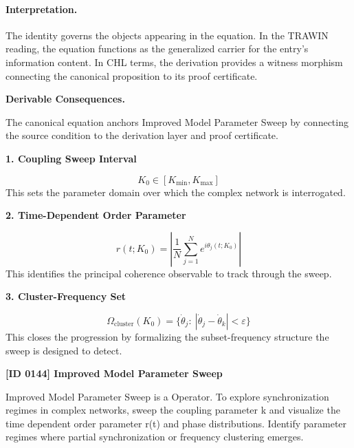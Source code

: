 \paragraph{Interpretation.}
The identity governs the objects appearing in the equation. In the TRAWIN reading, the equation functions as the generalized carrier for the entry’s information content. In CHL terms, the derivation provides a witness morphism connecting the canonical proposition to its proof certificate.

\par\vspace{0.35em}
\noindent\textbf{Derivable Consequences.}\quad
\begingroup
\footnotesize
\raggedright
The canonical equation anchors Improved Model Parameter Sweep by connecting the source condition to the derivation layer and proof certificate.
\par\endgroup

\noindent\textbf{1. Coupling Sweep Interval}\par
\[
K_0\in [K_{\min},K_{\max}]
\]
\noindent This sets the parameter domain over which the complex network is interrogated.\par
\noindent\textbf{2. Time-Dependent Order Parameter}\par
\[
r(t;K_0)=\left|\frac{1}{N}\sum_{j=1}^{N}e^{i\theta_j(t;K_0)}\right|
\]
\noindent This identifies the principal coherence observable to track through the sweep.\par
\noindent\textbf{3. Cluster-Frequency Set}\par
\[
\Omega_{\mathrm{cluster}}(K_0)=\{\dot{\theta}_j:\ |\dot{\theta}_j-\dot{\theta}_k|<\varepsilon\}
\]
\noindent This closes the progression by formalizing the subset-frequency structure the sweep is designed to detect.\par

\clearpage
\noindent\textbf{[ID 0144] Improved Model Parameter Sweep}\par
\vspace{0.35em}
\begingroup\small
{}
Improved Model Parameter Sweep is a Operator. To explore synchronization regimes in complex networks, sweep the coupling parameter k  and visualize the time dependent order parameter r(t) and phase distributions. Identify parameter regimes where partial synchronization or frequency clustering emerges.

